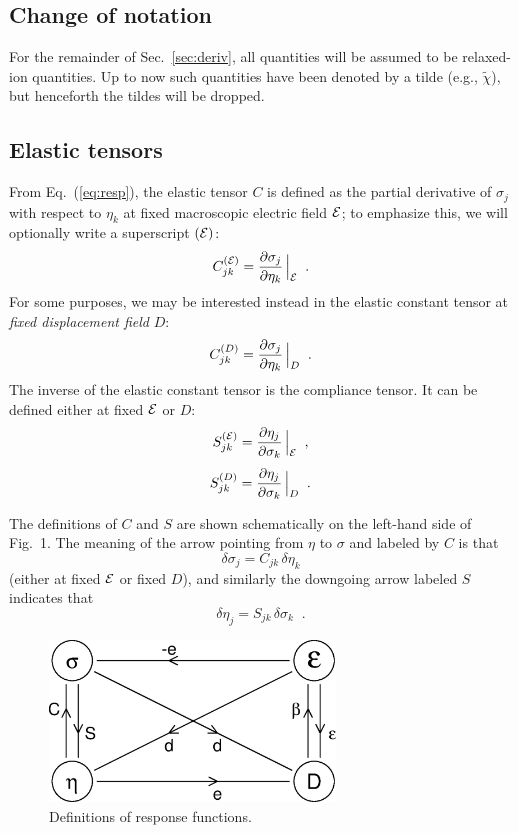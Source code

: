 \documentclass[11pt,fleqn]{article}
\def\beq{\begin{equation}}
\def\eeq{\end{equation}}
\def\wt#1{\widetilde{#1}}
\def\E{{\cal E}}
\begin{document}
\subsection{Change of notation}

For the remainder of Sec.~\ref{sec:deriv}, all quantities will
be assumed to be relaxed-ion quantities.  Up to now such quantities
have been denoted by a tilde (e.g., $\wt{\chi}$), but henceforth
the tildes will be dropped.

\subsection{Elastic tensors}
\label{sec:elas}

From Eq.~(\ref{eq:resp}), the elastic tensor $C$ is defined
as the partial derivative of $\sigma_j$ with respect to $\eta_k$
at fixed macroscopic electric field $\E$; to emphasize this,
we will optionally write a superscript $(\E)$:
%
\beq
C_{jk}^{(\E)}={\partial\sigma_j\over\partial\eta_k}\,\Big\vert_\E
\;\;.
\eeq
%
For some purposes, we may be interested instead in the elastic
constant tensor at {\it fixed displacement field} $D$:
%
\beq
C_{jk}^{(D)}={\partial\sigma_j\over\partial\eta_k}\,\Big\vert_D
\;\;.
\eeq
%
The inverse of the elastic constant tensor is the compliance
tensor.  It can be defined either at fixed $\E$ or $D$:
%
\beq
S_{jk}^{(\E)}={\partial\eta_j\over\partial\sigma_k}\,\Big\vert_\E
\;\;,
\eeq
%
\beq
S_{jk}^{(D)}={\partial\eta_j\over\partial\sigma_k}\,\Big\vert_D
\;\;.
\eeq

The definitions of $C$ and $S$ are shown schematically on the left-hand
side of Fig.~1.  The meaning of the arrow pointing from $\eta$ to
$\sigma$ and labeled by $C$ is that
%
\[ \delta\sigma_j=C_{jk}\,\delta\eta_k \]
%
(either at fixed $\E$ or fixed $D$), and similarly the downgoing
arrow labeled $S$ indicates that
%
\[ \delta\eta_j=S_{jk}\,\delta\sigma_k \;\;. \]

\begin{figure}
\begin{center}
\includegraphics[width=7.6cm,angle=0]{response}
\end{center}
\caption{Definitions of response functions.}
\label{fig:response}
\end{figure}
 
\end{document}
